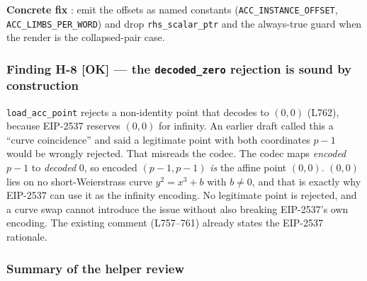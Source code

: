 \textbf{Concrete fix} : emit the offsets as named
constants (\texttt{ACC\_\allowbreak{}INSTANCE\_\allowbreak{}OFFSET}, \texttt{ACC\_\allowbreak{}LIMBS\_\allowbreak{}PER\_\allowbreak{}WORD})
and drop \texttt{rhs\_scalar\_ptr} and the always-true guard when
the render is the collapsed-pair case.

\subsubsection*{Finding H-8 \textcolor{tracegreen}{[OK]} --- the \texttt{decoded\_zero} rejection is sound by construction}

\texttt{load\_acc\_point} rejects a non-identity point that decodes
to $(0,0)$ (L762), because EIP-2537 reserves $(0,0)$ for infinity.
 An earlier draft called this a ``curve
coincidence'' and said a legitimate point with both coordinates
$p{-}1$ would be wrongly rejected. That misreads the codec. The
codec maps \emph{encoded} $p{-}1$ to \emph{decoded} 0, so encoded
$(p{-}1,p{-}1)$ \emph{is} the affine point $(0,0)$. $(0,0)$ lies on
no short-Weierstrass curve $y^2=x^3+b$ with $b\ne0$, and that is
exactly why EIP-2537 can use it as the infinity encoding. No
legitimate point is rejected, and a curve swap cannot introduce the
issue without also breaking EIP-2537's own encoding. The existing
comment (L757--761) already states the EIP-2537 rationale.

\subsubsection*{Summary of the helper review}

